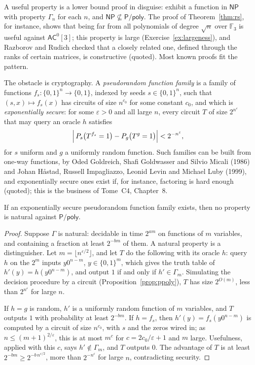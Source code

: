 A useful property is a lower bound proof in disguise: exhibit a function in $\mathsf{NP}$ with property $\Gamma_n$ for each $n$, and $\mathsf{NP}\not\subseteq\mathsf P/\mathsf{poly}$. The proof of Theorem~\ref{thm:rs}, for instance, shows that being far from all polynomials of degree $\sqrt n$ over $\mathbb F_3$ is useful against $\mathsf{AC}^0[3]$; this property is large (Exercise~\ref{ex:largeness}), and Razborov and Rudich checked that a closely related one, defined through the ranks of certain matrices, is constructive (quoted). Most known proofs fit the pattern.

The obstacle is cryptography. A \emph{pseudorandom function family} is a family of functions $f_s:\{0,1\}^n\to\{0,1\}$, indexed by seeds $s\in\{0,1\}^n$, such that $(s,x)\mapsto f_s(x)$ has circuits of size $n^{c_0}$ for some constant $c_0$, and which is \emph{exponentially secure}: for some $\varepsilon>0$ and all large $n$, every circuit $T$ of size $2^{n^\varepsilon}$ that may query an oracle $h$ satisfies
\[
\Bigl|\,P_s\bigl(T^{f_s}=1\bigr)-P_g\bigl(T^{g}=1\bigr)\Bigr|<2^{-n^\varepsilon},
\]
for $s$ uniform and $g$ a uniformly random function. Such families can be built from one-way functions, by Oded Goldreich, Shafi Goldwasser and Silvio Micali (1986) and Johan Håstad, Russell Impagliazzo, Leonid Levin and Michael Luby (1999), and exponentially secure ones exist if, for instance, factoring is hard enough (quoted); this is the business of Tome~C4, Chapter~8.

\begin{theorem}\label{thm:naturalproofs}
If an exponentially secure pseudorandom function family exists, then no property is natural against $\mathsf P/\mathsf{poly}$.
\end{theorem}

\begin{proof}
Suppose $\Gamma$ is natural: decidable in time $2^{am}$ on functions of $m$ variables, and containing a fraction at least $2^{-bm}$ of them. A natural property is a distinguisher. Let $m=\lfloor n^{\varepsilon/2}\rfloor$, and let $T$ do the following with its oracle $h$: query $h$ on the $2^m$ inputs $y0^{n-m}$, $y\in\{0,1\}^m$, which gives the truth table of $h'(y)=h(y0^{n-m})$, and output $1$ if and only if $h'\in\Gamma_m$. Simulating the decision procedure by a circuit (Proposition~\ref{prop:ppoly}), $T$ has size $2^{O(m)}$, less than $2^{n^\varepsilon}$ for large $n$.

If $h=g$ is random, $h'$ is a uniformly random function of $m$ variables, and $T$ outputs $1$ with probability at least $2^{-bm}$. If $h=f_s$, then $h'(y)=f_s(y0^{n-m})$ is computed by a circuit of size $n^{c_0}$, with $s$ and the zeros wired in; as $n\le(m+1)^{2/\varepsilon}$, this is at most $m^c$ for $c=2c_0/\varepsilon+1$ and $m$ large. Usefulness, applied with this $c$, says $h'\notin\Gamma_m$, and $T$ outputs $0$. The advantage of $T$ is at least $2^{-bm}\ge2^{-b\,n^{\varepsilon/2}}$, more than $2^{-n^\varepsilon}$ for large $n$, contradicting security.
\end{proof}

